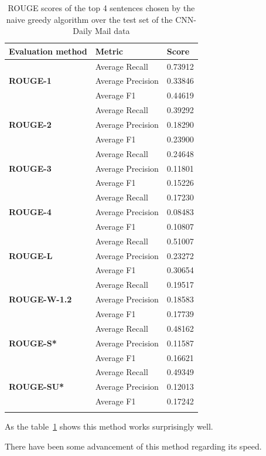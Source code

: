 \begin{longtable}{| l | l | l |}
	\hline
	\textbf{Evaluation method}&\textbf{Metric}&\textbf{Score}\\ \hline \hline
	\multirow{3}{*}{\textbf{ROUGE-1}}
	&Average Recall&0.73912\\
	&Average Precision&0.33846 \\
	&Average F1&0.44619 \\ \hline \hline
	\multirow{3}{*}{\textbf{ROUGE-2}}
	&Average Recall&0.39292 \\
	&Average Precision&0.18290 \\
	&Average F1&0.23900 \\ \hline \hline
	\multirow{3}{*}{\textbf{ROUGE-3}}
	&Average Recall&0.24648 \\
	&Average Precision&0.11801 \\
	&Average F1&0.15226 \\ \hline \hline
	\multirow{3}{*}{\textbf{ROUGE-4}}
	&Average Recall&0.17230 \\
	&Average Precision&0.08483 \\
	&Average F1&0.10807 \\ \hline \hline
	\multirow{3}{*}{\textbf{ROUGE-L}}
	&Average Recall&0.51007 \\
	&Average Precision&0.23272 \\
	&Average F1&0.30654 \\ \hline \hline
	\multirow{3}{*}{\textbf{ROUGE-W-1.2}}
	&Average Recall&0.19517 \\
	&Average Precision&0.18583 \\
	&Average F1&0.17739 \\ \hline \hline
	\multirow{3}{*}{\textbf{ROUGE-S*}}
	&Average Recall&0.48162 \\
	&Average Precision&0.11587 \\
	&Average F1&0.16621 \\ \hline \hline
	\multirow{3}{*}{\textbf{ROUGE-SU*}}
	&Average Recall&0.49349 \\
	&Average Precision&0.12013 \\
	&Average F1&0.17242 \\ \hline
	\caption{ROUGE scores of the top 4 sentences chosen by the naive greedy algorithm over the test set of the CNN-Daily Mail data}
	\label{tab:extr}
\end{longtable}
As the table~\ref{tab:extr} shows this method works surprisingly well.

There have been some advancement of this method regarding its speed\cite{GreedySum}.

